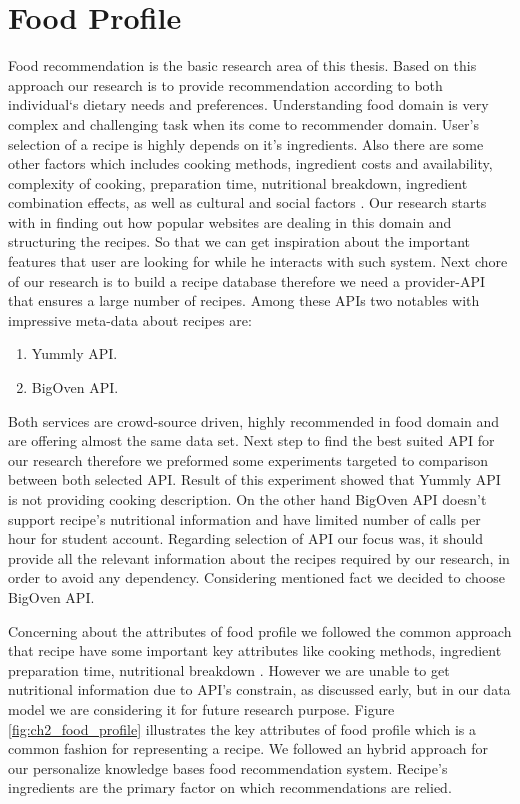 \section{Food Profile}

Food recommendation is the basic research area of this thesis. Based on this approach our research is to provide recommendation according to both individual‘s dietary needs and preferences. Understanding food domain is very complex and challenging task when its come to recommender domain. User’s selection of a recipe is highly depends on it’s ingredients. Also there are some other factors which includes cooking methods, ingredient costs and availability, complexity of cooking, preparation time, nutritional breakdown, ingredient combination effects, as well as cultural and social factors \cite{freyne2010recommending}. Our research starts with in finding out how popular websites are dealing in this domain and structuring the recipes. So that we can get inspiration about the important features that user are looking for while he interacts with such system. Next chore of our research is to build a recipe database therefore we need a provider-API that ensures a large number of recipes. Among these APIs two notables with impressive meta-data about recipes are:

\begin{enumerate}
	\item Yummly API.
	\item BigOven API.	
\end{enumerate}

Both services are crowd-source driven, highly recommended in food domain and are offering almost the same data set. Next step to find the best suited API for our research therefore we preformed some experiments targeted to comparison between both selected API. Result of this experiment showed that Yummly API is not providing cooking description. On the other hand BigOven API doesn’t support recipe’s nutritional information and have limited number of calls per hour for student account. Regarding selection of API our focus was, it should provide all the relevant information about the recipes required by our research, in order to avoid any dependency. Considering mentioned fact we decided to choose BigOven API.\newline

Concerning about the attributes of food profile we followed the common approach that recipe have some important key attributes like cooking methods, ingredient preparation time, nutritional breakdown \cite{freyne2010recommending}.  However we are unable to get nutritional information due to API’s constrain, as discussed early, but in our data model we are considering it for future research purpose.  Figure \ref{fig:ch2_food_profile} illustrates the key attributes of food profile which is a common fashion for representing a recipe. We followed an hybrid approach \cite{suksom2010knowledge}
\cite{teng2012recipe} \cite{freyne2010recommending} for our personalize knowledge bases food recommendation system. Recipe’s ingredients are the primary factor on which recommendations are relied. 

